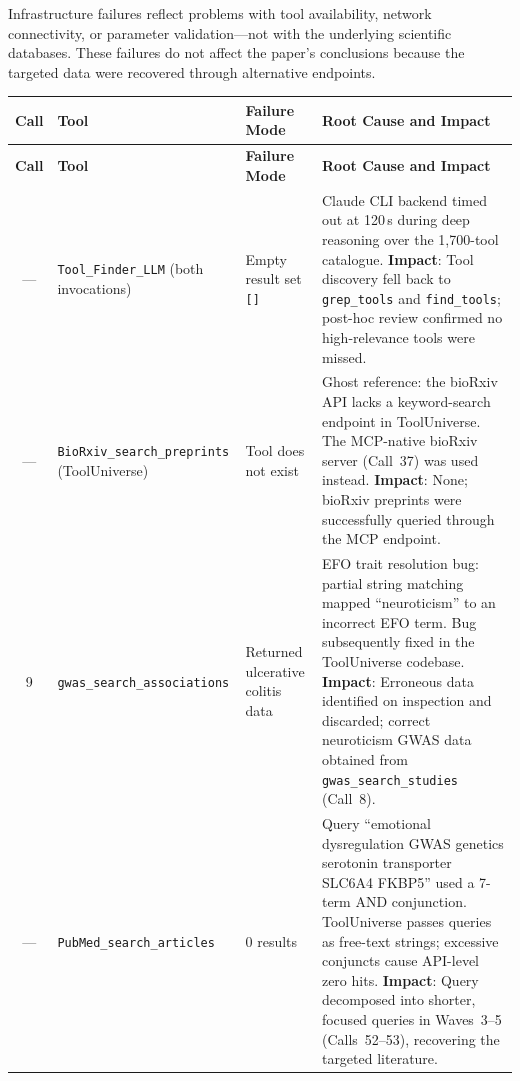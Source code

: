 Infrastructure failures reflect problems with tool availability, network
connectivity, or parameter validation---not with the underlying scientific
databases.  These failures do not affect the paper's conclusions because the
targeted data were recovered through alternative endpoints.

\begin{longtable}{@{}c p{3.0cm} p{3.5cm} p{5.5cm}@{}}
\toprule
\textbf{Call} & \textbf{Tool} & \textbf{Failure Mode} &
\textbf{Root Cause and Impact} \\
\midrule
\endfirsthead
\toprule
\textbf{Call} & \textbf{Tool} & \textbf{Failure Mode} &
\textbf{Root Cause and Impact} \\
\midrule
\endhead
\bottomrule
\endlastfoot

--- &
\texttt{Tool\_Finder\_LLM} (both invocations) &
Empty result set \texttt{[]} &
Claude CLI backend timed out at 120\,s during deep reasoning over the
1,700-tool catalogue.  \textbf{Impact}: Tool discovery fell back to
\texttt{grep\_tools} and \texttt{find\_tools}; post-hoc review confirmed no
high-relevance tools were missed. \\
\midrule

--- &
\texttt{BioRxiv\_search\_\allowbreak preprints} (ToolUniverse) &
Tool does not exist &
Ghost reference: the bioRxiv API lacks a keyword-search endpoint in
ToolUniverse.  The MCP-native bioRxiv server (Call~37) was used instead.
\textbf{Impact}: None; bioRxiv preprints were successfully queried through the
MCP endpoint. \\
\midrule

9 &
\texttt{gwas\_search\_\allowbreak associations} &
Returned ulcerative colitis data &
EFO trait resolution bug: partial string matching mapped ``neuroticism'' to an
incorrect EFO term.  Bug subsequently fixed in the ToolUniverse codebase.
\textbf{Impact}: Erroneous data identified on inspection and discarded;
correct neuroticism GWAS data obtained from \texttt{gwas\_search\_studies}
(Call~8). \\
\midrule

--- &
\texttt{PubMed\_search\_\allowbreak articles} &
0 results &
Query ``emotional dysregulation GWAS genetics serotonin transporter SLC6A4
FKBP5'' used a 7-term AND conjunction.  ToolUniverse passes queries as
free-text strings; excessive conjuncts cause API-level zero hits.
\textbf{Impact}: Query decomposed into shorter, focused queries in
Waves~3--5 (Calls~52--53), recovering the targeted literature. \\
\midrule


\end{longtable}
